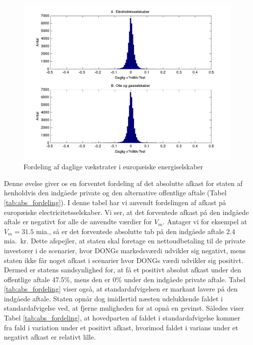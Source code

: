 \documentclass{article}
\begin{document}
\begin{figure}
\includegraphics[scale=0.8]{../matlab/figs/data_hist}
\caption{Fordeling af daglige v\ae{}kstrater i europ\ae{}iske energiselskaber}
\label{fig:data_hist}
\end{figure}

Denne øvelse giver os en forventet fordeling af det absolutte afkast for staten af henholdvis den indgåede private og den alternative offentlige aftale (Tabel \ref{tab:abs_fordeling}). I denne tabel har vi anvendt fordelingen af afkast på europæiske electricitetsselskaber. Vi ser, at det forventede afkast på den indgåede aftale er negativt for alle de anvendte værdier for $V_m$. Antager vi for eksempel at $V_m=31.5$ mia., så er det forventede absolutte tab på den indgåede aftale 2.4 mia.\ kr. Dette afspejler, at staten skal foretage en nettoudbetaling til de private investorer i de scenarier, hvor DONGs markedsværdi udvikler sig negativt, mens staten ikke får noget afkast i scenarier hvor DONGs værdi udvikler sig positivt. Dermed er statens sandsynlighed for, at få et positivt absolut afkast under den offentlige aftale 47.5\%, mens den er 0\% under den indgåede private aftale. Tabel \ref{tab:abs_fordeling} viser også, at standardafvigelsen er markant lavere på den indgåede aftale. Staten opnår dog imidlertid næsten udelukkende faldet i standardafvigelse ved, at fjerne muligheden for at opnå en gevinst. Således viser Tabel \ref{tab:abs_fordeling}, at hovedparten af faldet i standardafvigelse kommer fra fald i variation under et positivt afkast, hvorimod faldet i varians under et negativt afkast er relativt lille.
\end{document}
